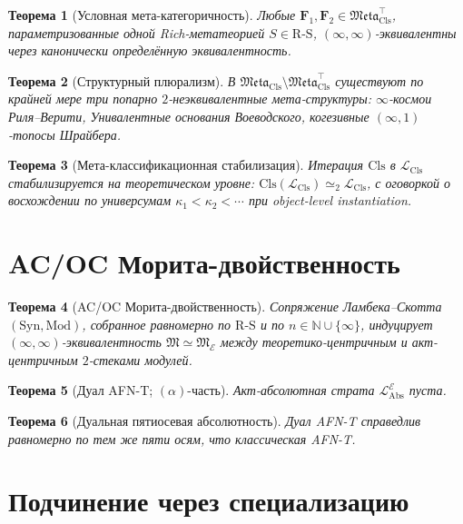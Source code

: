 \documentclass[11pt]{article}
\theoremstyle{plain}
\newtheorem{theorem}{Теорема}[section]
\theoremstyle{definition}
\newcommand{\RS}{\mathrm{R\text{-}S}}
\newcommand{\fM}{\mathfrak{M}}
\newcommand{\Meta}{\mathfrak{Meta}}
\newcommand{\LCls}{\mathcal{L}_{\mathrm{Cls}}}
\newcommand{\LAbs}{\mathcal{L}_{\mathrm{Abs}}}
\newcommand{\Syn}{\mathrm{Syn}}
\newcommand{\Mod}{\mathrm{Mod}}
\newcommand{\cE}{\mathcal{E}}
\newcommand{\LAbsE}{\LAbs^{\cE}}
\begin{document}
\begin{theorem}[Условная мета-категоричность]\label{thm:meta-cat}
Любые $\mathbf{F}_1, \mathbf{F}_2 \in \Meta_{\mathrm{Cls}}^{\top}$, параметризованные одной Rich-метатеорией $S \in \RS$, $(\infty, \infty)$-эквивалентны через канонически определённую эквивалентность.
\end{theorem}

\begin{theorem}[Структурный плюрализм]\label{thm:meta-mult}
В $\Meta_{\mathrm{Cls}} \setminus \Meta_{\mathrm{Cls}}^{\top}$ существуют по крайней мере три попарно $2$-неэквивалентные мета-структуры: $\infty$-космои Риля--Верити, Унивалентные основания Воеводского, когезивные $(\infty,1)$-топосы Шрайбера.
\end{theorem}

\begin{theorem}[Мета-классификационная стабилизация]\label{thm:meta-stab}
Итерация $\mathrm{Cls}$ в $\LCls$ стабилизируется на теоретическом уровне: $\mathrm{Cls}(\LCls) \simeq_2 \LCls$, с оговоркой о восхождении по универсумам $\kappa_1 < \kappa_2 < \cdots$ при object-level instantiation.
\end{theorem}

\section{AC/OC Морита-двойственность}\label{sec:duality}

\begin{theorem}[AC/OC Морита-двойственность]\label{thm:ac-oc-duality}
Сопряжение Ламбека--Скотта $(\Syn, \Mod)$, собранное равномерно по $\RS$ и по $n \in \mathbb{N} \cup \{\infty\}$, индуцирует $(\infty, \infty)$-эквивалентность $\fM \simeq \fM_\cE$ между теоретико-центричным и акт-центричным $2$-стеками модулей.
\end{theorem}

\begin{theorem}[Дуал AFN-T; $(\alpha)$-часть]\label{thm:dual-afnt}
Акт-абсолютная страта $\LAbsE$ пуста.
\end{theorem}

\begin{theorem}[Дуальная пятиосевая абсолютность]\label{thm:dual-five-axis}
Дуал AFN-T справедлив равномерно по тем же пяти осям, что классическая AFN-T.
\end{theorem}

\section{Подчинение через специализацию}\label{sec:subsumption}
\end{document}
